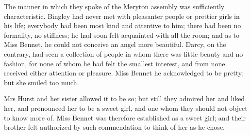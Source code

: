 The manner in which they spoke of the Meryton assembly was sufficiently characteristic. Bingley had never met with pleasanter people or prettier girls in his life; everybody had been most kind and attentive to him; there had been no formality, no stiffness; he had soon felt acquainted with all the room; and as to Miss Bennet, he could not conceive an angel more beautiful. Darcy, on the contrary, had seen a collection of people in whom there was little beauty and no fashion, for none of whom he had felt the smallest interest, and from none received either attention or pleasure. Miss Bennet he acknowledged to be pretty; but she smiled too much.

Mrs Hurst and her sister allowed it to be so; but still they admired her and liked her, and pronounced her to be a sweet girl, and one whom they should not object to know more of. Miss Bennet was therefore established as a sweet girl; and their brother felt authorized by such commendation to think of her as he chose.